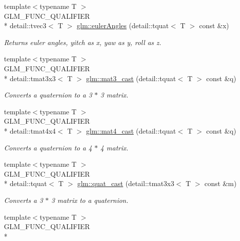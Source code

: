 \begin{DoxyCompactItemize}
{\footnotesize template$<$typename T $>$ }\\G\-L\-M\-\_\-\-F\-U\-N\-C\-\_\-\-Q\-U\-A\-L\-I\-F\-I\-E\-R \\*
detail\-::tvec3$<$ T $>$ \hyperlink{group__gtc__quaternion_gaa53e0e8933e176c6207720433fb8dd2b}{glm\-::euler\-Angles} (detail\-::tquat$<$ T $>$ const \&x)
\begin{DoxyCompactList}\small\item\em Returns euler angles, yitch as x, yaw as y, roll as z. \end{DoxyCompactList}\item 
{\footnotesize template$<$typename T $>$ }\\G\-L\-M\-\_\-\-F\-U\-N\-C\-\_\-\-Q\-U\-A\-L\-I\-F\-I\-E\-R \\*
detail\-::tmat3x3$<$ T $>$ \hyperlink{group__gtc__quaternion_gae04ce320008c9bec0037b4ba21853cb5}{glm\-::mat3\-\_\-cast} (detail\-::tquat$<$ T $>$ const \&q)
\begin{DoxyCompactList}\small\item\em Converts a quaternion to a 3 $\ast$ 3 matrix. \end{DoxyCompactList}\item 
{\footnotesize template$<$typename T $>$ }\\G\-L\-M\-\_\-\-F\-U\-N\-C\-\_\-\-Q\-U\-A\-L\-I\-F\-I\-E\-R \\*
detail\-::tmat4x4$<$ T $>$ \hyperlink{group__gtc__quaternion_ga8c376eb15971eb52d85df5ee26825627}{glm\-::mat4\-\_\-cast} (detail\-::tquat$<$ T $>$ const \&q)
\begin{DoxyCompactList}\small\item\em Converts a quaternion to a 4 $\ast$ 4 matrix. \end{DoxyCompactList}\item 
{\footnotesize template$<$typename T $>$ }\\G\-L\-M\-\_\-\-F\-U\-N\-C\-\_\-\-Q\-U\-A\-L\-I\-F\-I\-E\-R \\*
detail\-::tquat$<$ T $>$ \hyperlink{group__gtc__quaternion_ga4d37447d81ceade1d10d68c995a4d881}{glm\-::quat\-\_\-cast} (detail\-::tmat3x3$<$ T $>$ const \&m)
\begin{DoxyCompactList}\small\item\em Converts a 3 $\ast$ 3 matrix to a quaternion. \end{DoxyCompactList}\item 
{\footnotesize template$<$typename T $>$ }\\G\-L\-M\-\_\-\-F\-U\-N\-C\-\_\-\-Q\-U\-A\-L\-I\-F\-I\-E\-R \\*

\end{DoxyCompactItemize}
